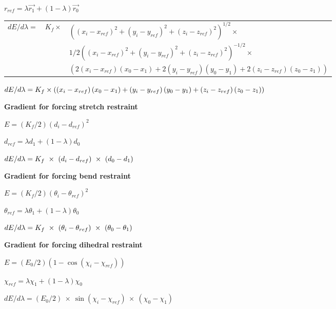 $r_{ref}=\lambda \overrightarrow{r_{1}}+\left( 1-\lambda \right) 
\overrightarrow{r_{0}}$

\begin{tabular}{lll}
$dE/d\lambda =$ & $K_{f}\times $ & $\left( \left( x_{i}-x_{ref}\right)
^{2}+\left( y_{i}-y_{ref}\right) ^{2}+\left( z_{i}-z_{ref}\right)
^{2}\right) ^{1/2}\times $ \\ 
&  & $1/2\left( \left( x_{i}-x_{ref}\right) ^{2}+\left( y_{i}-y_{ref}\right)
^{2}+\left( z_{i}-z_{ref}\right) ^{2}\right) ^{-1/2}\times $ \\ 
&  & $\left( 2\left( x_{i}-x_{ref}\right) \left( x_{0}-x_{1}\right) +2\left(
y_{i}-y_{ref}\right) \left( y_{0}-y_{1}\right) +2\left( z_{i}-z_{ref}\right)
\left( z_{0}-z_{1}\right) \right) $%
\end{tabular}

$dE/d\lambda =K_{f}\times \left( \left( x_{i}-x_{ref}\right) \left(
x_{0}-x_{1}\right) +\left( y_{i}-y_{ref}\right) \left( y_{0}-y_{1}\right)
+\left( z_{i}-z_{ref}\right) \left( z_{0}-z_{1}\right) \right) \bigskip $

{\bf Gradient for forcing stretch restraint}

$E=\left( K_{f}/2\right) \left( d_{i}-d_{ref}\right) ^{2}$

$d_{ref}=\lambda d_{1}+\left( 1-\lambda \right) d_{0}$

$dE/d\lambda =K_{f}~\times ~\left( d_{i}-d_{ref}\right) ~\times ~\left(
d_{0}-d_{1}\right) \bigskip $

{\bf Gradient for forcing bend restraint}

$E=\left( K_{f}/2\right) \left( \theta _{i}-\theta _{ref}\right) ^{2}$

$\theta _{ref}=\lambda \theta _{1}+\left( 1-\lambda \right) \theta _{0}$

$dE/d\lambda =K_{f}~\times ~\left( \theta _{i}-\theta _{ref}\right) ~\times %
~\left( \theta _{0}-\theta _{1}\right) \bigskip $

{\bf Gradient for forcing dihedral restraint}

$E=\left( E_{0}/2\right) \left( 1-\cos \left( \chi _{i}-\chi _{ref}\right)
\right) $

$\chi _{ref}=\lambda \chi _{1}+\left( 1-\lambda \right) \chi _{0}$

$dE/d\lambda =\left( E_{0}/2\right) ~\times ~\sin \left( \chi _{i}-\chi
_{ref}\right) ~\times ~\left( \chi _{0}-\chi _{1}\right) $

